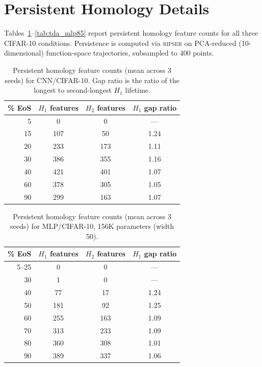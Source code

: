\documentclass[aps,prl,twocolumn,superscriptaddress]{revtex4-2}
\begin{document}
\section{Persistent Homology Details}

Tables~\ref{tab:tda}--\ref{tab:tda_mlp85} report persistent homology feature counts for all three CIFAR-10 conditions. Persistence is computed via \textsc{ripser} on PCA-reduced (10-dimensional) function-space trajectories, subsampled to 400 points.

\begin{table}[h]
\caption{\label{tab:tda}%
Persistent homology feature counts (mean across 3 seeds) for CNN/CIFAR-10. Gap ratio is the ratio of the longest to second-longest $H_1$ lifetime.}
\begin{ruledtabular}
\begin{tabular}{rccc}
\% EoS & $H_1$ features & $H_2$ features & $H_1$ gap ratio\\
\hline
5 & 0 & 0 & ---\\
15 & 107 & 50 & 1.24\\
20 & 233 & 173 & 1.11\\
30 & 386 & 355 & 1.16\\
40 & 421 & 401 & 1.07\\
60 & 378 & 305 & 1.05\\
90 & 299 & 163 & 1.07\\
\end{tabular}
\end{ruledtabular}
\end{table}

\begin{table}[h]
\caption{\label{tab:tda_mlp50}%
Persistent homology feature counts (mean across 3 seeds) for MLP/CIFAR-10, 156K parameters (width 50).}
\begin{ruledtabular}
\begin{tabular}{rccc}
\% EoS & $H_1$ features & $H_2$ features & $H_1$ gap ratio\\
\hline
5--25 & 0 & 0 & ---\\
30 & 1 & 0 & ---\\
40 & 77 & 17 & 1.24\\
50 & 181 & 92 & 1.25\\
60 & 255 & 163 & 1.09\\
70 & 313 & 233 & 1.09\\
80 & 360 & 308 & 1.01\\
90 & 389 & 337 & 1.06\\
\end{tabular}
\end{ruledtabular}
\end{table}
\end{document}
